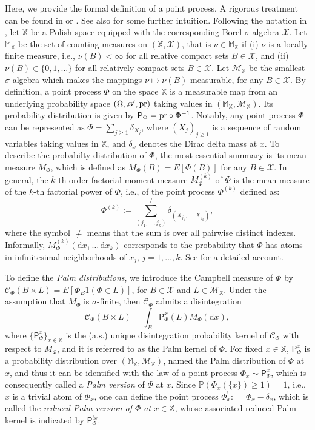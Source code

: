 \documentclass[11pt,a4paper,oneside]{article}
\newcommand{\indicator}{\ensuremath{{1}}}
\newcommand{\calM}{\mathcal{M}}
\newcommand{\dd}{\mathrm d}
\newcommand{\plaw}{\mathsf{P}}
\newcommand{\E}{E}
\newcommand{\Xcr}{\mathscr{X}}
\newcommand{\Acr}{\mathscr{A}}
\newcommand{\Pp}{\mathbb{P}}
\newcommand{\X}{\mathbb{X}}
\newcommand{\M}{\mathbb{M}}
\newcommand{\prob}{{\rm pr}}
\theoremstyle{definition}
\theoremstyle{remark}
\begin{document}
Here, we provide the formal definition of a point process. A rigorous treatment can be found in \cite{DaVeJo2} or \cite{BaBlaKa}. See also \cite{Kallenberg84} for some further intuition. Following the notation in \cite{BaBlaKa}, let $\X$ be a Polish space equipped with the corresponding Borel $\sigma$-algebra $\Xcr$.  
Let $\M_{\X}$ be the set of counting measures on $(\X, \Xcr)$, that is  $\nu \in \M_{\X}$ if (i) $\nu$ is a locally finite measure, i.e., $\nu(B) < \infty$ for all relative compact sets $B \in \Xcr$, and (ii) $\nu(B) \in \{0,1,\ldots\}$ for all relatively compact sets $B \in \Xcr$. Let $\mathcal M_{\X}$ be the smallest $\sigma$-algebra which makes the mappings $\nu \mapsto \nu(B)$ measurable, for any $B \in \Xcr$. By definition, a point process $\Phi$ on the space $\X$ is a measurable map from an underlying probability space $(\Omega, \Acr, \prob)$ taking values in $(\M_{\X}, \mathcal M_{\X})$. Its probability distribution is given by $\plaw_\Phi = \prob \circ \Phi^{-1}$. Notably, any point process $\Phi$ can be represented as $\Phi = \sum_{j\geq 1} \delta_{X_j}$, where $(X_j)_{j\geq 1}$ is a sequence of random variables taking values in $\X$, and  $\delta_{x}$ denotes the Dirac delta mass at $x$.
To describe the probabilty distribution of $\Phi$, the most essential summary is its mean measure $M_{\Phi}$, which is defined as $M_{\Phi}(B) = \E[\Phi(B)]$ for any $B \in \Xcr$. In general, the $k$-th order factorial moment measure $M_{\Phi}^{(k)}$ of $\Phi$ is the mean measure of the $k$-th factorial power of $\Phi$, i.e., of the point process $\Phi^{(k)}$  defined as:
\[
    \Phi^{(k)} := \sum_{(j_1, \ldots, j_k)}^{\not =}  \delta_{(X_{j_1}, \ldots, X_{j_k})},
\]
where the symbol $\not =$ means that the sum is over all pairwise distinct indexes. Informally, $M_{\Phi}^{(k)}(\dd x_1\,\ldots\, \dd x_k)$ corresponds to the probability that $\Phi$ has atoms in infinitesimal neighborhoods of $x_j$, $j=1, \ldots, k$. See \cite{BaBlaKa} for a detailed account.

To define the \emph{Palm distributions}, we introduce the Campbell measure of $\Phi$ by $\mathscr C_{\Phi}(B \times L) = \E[\Phi_B \indicator(\Phi \in L)]$, for  $B \in \Xcr$ and  $L \in \calM_{\X}$.
Under the assumption that $M_\Phi$ is $\sigma$-finite, then $\mathscr C_{\Phi}$ admits a disintegration
\[
   \mathscr C_{\Phi}(B \times L) = \int_B \plaw_{\Phi}^x(L) M_\Phi(\dd x),
\]
where $\{\plaw_{\Phi}^x\}_{x \in \X}$ is the (a.s.) unique disintegration probability kernel of $\mathscr C_\Phi$ with respect to $M_\Phi$, and it is referred to as the Palm kernel of $\Phi$.
For fixed $x \in \X$, $\plaw_{\Phi}^x$ is a probability distribution over $(\M_{\X}, \calM_{\X})$, named the Palm distribution of $\Phi$ at $x$, and thus it can be identified with the law of a point process $\Phi_x \sim \plaw_{\Phi}^x$, which is consequently called a \emph{Palm version} of $\Phi$ at $x$. Since $\Pp(\Phi_x(\{x\}) \geq  1) = 1$, i.e., $x$ is a trivial atom of $\Phi_x$, one can define the point process $\Phi^!_{x}:  = \Phi_{x} - \delta_{x}$, which is called 
the \textit{reduced Palm version of $\Phi$ at $x \in \X$}, whose associated reduced Palm kernel is indicated by $\plaw_{\Phi}^{!x}$.
\end{document}
